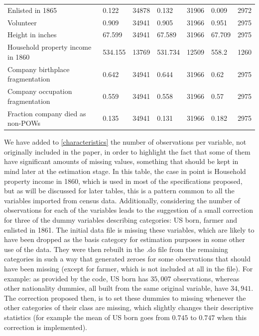 \documentclass[draft.tex]{subfiles}
\begin{document}
\begin{table}[bt]
\begin{tabular}{lllllll}
Enlisted in 1865                  & 0.122   & 34878 & 0.132   & 31906 & 0.009  & 2972 \\
Volunteer                         & 0.909   & 34941 & 0.905   & 31966 & 0.951  & 2975 \\
Height in inches                  & 67.599  & 34941 & 67.589  & 31966 & 67.709 & 2975 \\
Household property income in 1860 & 534.155 & 13769 & 531.734 & 12509 & 558.2  & 1260 \\
Company birthplace fragmentation  & 0.642   & 34941 & 0.644   & 31966 & 0.62   & 2975 \\
Company occupation fragmentation  & 0.559   & 34941 & 0.558   & 31966 & 0.57   & 2975 \\
Fraction company died as non-POWs & 0.135   & 34941 & 0.131   & 31966 & 0.182  & 2975 \\
\end{tabular}
\end{table}

We have added to \autoref{characteristics} the number of observations per variable, not originally included in the paper, in order to highlight the fact that some of them have significant amounts of missing values, something that should be kept in mind later at the estimation stage. In this table, the case in point is Household property income in 1860, which is used in most of the specifications proposed, but as will be discussed for later tables, this is a pattern common to all the variables imported from census data. 
Additionally, considering the number of observations for each of the variables leads to the suggestion of a small correction for three of the dummy variables describing categories: US born, farmer and enlisted in 1861. The initial data file is missing these variables, which are likely to have been dropped as the basis category for estimation purposes in some other use of the data. They were then rebuilt in the .do file from the remaining categories in such a way that generated zeroes for some observations that should have been missing (except for farmer, which is not included at all in the file). For example: as provided by the code, US born has $35,007$ observations, whereas other nationality dummies, all built from the same original variable, have $34,941$. The correction proposed then, is to set these dummies to missing whenever the other categories of their class are missing, which slightly changes their descriptive statistics (for example the mean of US born goes from $0.745$ to $0.747$ when this correction is implemented).
\end{document}
